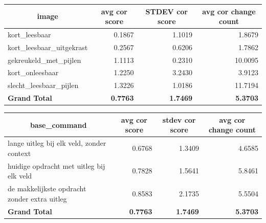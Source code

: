 \documentclass[12pt]{article}
\begin{document}
\noindent\begin{table}[H]\begin{tabularx}{\textwidth}{X *3{r}}
    \toprule
    \multicolumn{1}{c}{\textbf{image}} & \multicolumn{1}{c}{\textbf{avg cor score}} & \multicolumn{1}{c}{\textbf{STDEV cor score}} & \multicolumn{1}{c}{\textbf{avg cor change count}} \\
    \midrule
    kort_leesbaar & 0.1867 & 1.1019 & 1.8679 \\
    kort_leesbaar_uitgekrast & 0.2567 & 0.6206 & 1.7862 \\
    gekreukeld_met_pijlen & 1.1113 & 0.2310 & 10.0095 \\
    kort_onleesbaar & 1.2250 & 3.2430 & 3.9123 \\
    slecht_leesbaar_pijlen & 1.3226 & 1.0186 & 11.7194 \\
    \midrule
    \textbf{Grand Total} & \textbf{0.7763} & \textbf{1.7469} & \textbf{5.3703} \\
    \bottomrule
\end{tabularx}%
\end{table}




\noindent\begin{table}[H]\begin{tabularx}{\textwidth}{X *3{r}}
    \toprule
    \multicolumn{1}{c}{\textbf{base\_command}} & \multicolumn{1}{c}{\textbf{avg cor score}} & \multicolumn{1}{c}{\textbf{stdev cor score}} & \multicolumn{1}{c}{\textbf{avg cor change count}} \\
    \midrule
    lange uitleg bij elk veld, zonder context & 0.6768 & 1.3409 & 4.6585 \\
    huidige opdracht met uitleg bij elk veld & 0.7828 & 1.5641 & 5.8461 \\
    de makkelijkste opdracht zonder extra uitleg & 0.8583 & 2.1735 & 5.5504 \\
    \midrule
    \textbf{Grand Total} & \textbf{0.7763} & \textbf{1.7469} & \textbf{5.3703} \\
    \bottomrule
\end{tabularx}%
\end{table}
\end{document}
